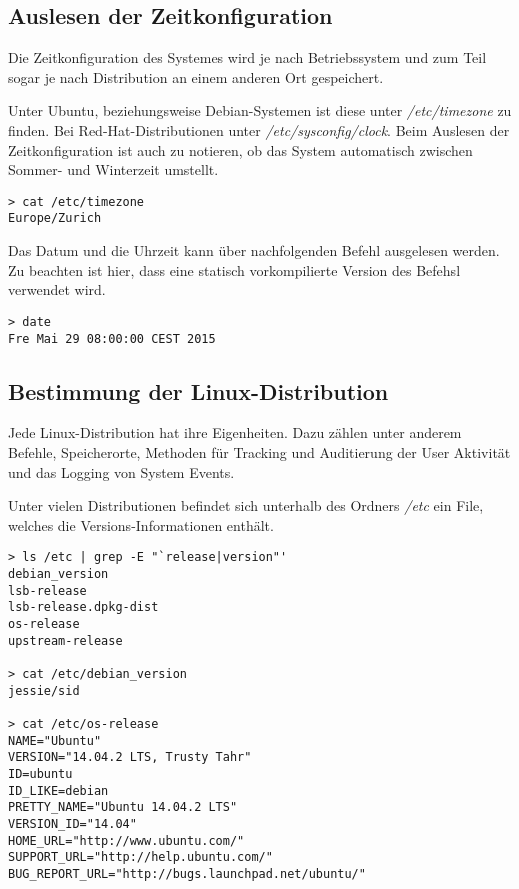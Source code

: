 \subsection{Auslesen der Zeitkonfiguration}
Die Zeitkonfiguration des Systemes wird je nach Betriebssystem und zum Teil sogar je nach Distribution an einem anderen Ort gespeichert.

Unter Ubuntu, beziehungsweise Debian-Systemen ist diese unter \textit{/etc/timezone} zu finden. Bei Red-Hat-Distributionen unter \textit{/etc/sysconfig/clock}.
Beim Auslesen der Zeitkonfiguration ist auch zu notieren, ob das System automatisch zwischen Sommer- und Winterzeit umstellt.

\begin{lstlisting}
> cat /etc/timezone
Europe/Zurich
\end{lstlisting}

Das Datum und die Uhrzeit kann über nachfolgenden Befehl ausgelesen werden. Zu beachten ist hier, dass eine statisch vorkompilierte Version des Befehsl verwendet wird.
\begin{lstlisting}
> date
Fre Mai 29 08:00:00 CEST 2015
\end{lstlisting}



\subsection{Bestimmung der Linux-Distribution}
Jede Linux-Distribution hat ihre Eigenheiten. Dazu zählen unter anderem Befehle, Speicherorte, Methoden für Tracking und Auditierung der User Aktivität und das Logging von System Events.

Unter vielen Distributionen befindet sich unterhalb des Ordners \textit{/etc} ein File, welches die Versions-Informationen enthält.\\
\begin{lstlisting}
> ls /etc | grep -E "`release|version"'
debian_version
lsb-release
lsb-release.dpkg-dist
os-release
upstream-release

> cat /etc/debian_version
jessie/sid

> cat /etc/os-release
NAME="Ubuntu"
VERSION="14.04.2 LTS, Trusty Tahr"
ID=ubuntu
ID_LIKE=debian
PRETTY_NAME="Ubuntu 14.04.2 LTS"
VERSION_ID="14.04"
HOME_URL="http://www.ubuntu.com/"
SUPPORT_URL="http://help.ubuntu.com/"
BUG_REPORT_URL="http://bugs.launchpad.net/ubuntu/"
\end{lstlisting}

